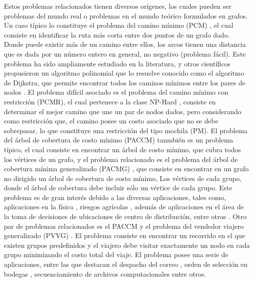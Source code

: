 Estos problemas relacionados tienen diversos orígenes, los cuales pueden ser problemas del mundo real o problemas en el mundo teórico formulados en grafos.
Un caso típico lo constituye el problema del camino mínimo (PCM) \citep{papadimitriou1982combinatorial}, el cual consiste en identificar la ruta más corta entre dos puntos de un grafo dado. Donde puede existir más de un camino entre ellos, los arcos tienen una distancia que es dada por un número entero en general, no negativo (problema fácil). Este problema ha sido ampliamente estudiado en la literatura, \cite{dijkstra1959note} y otros científicos propusieron un algoritmo polinomial que lo resuelve conocido como el algoritmo de Dijkstra, que permite encontrar todos los caminos mínimos entre los pares de nodos \citep{cook1995combinatorial}. El problema difícil asociado es el problema del camino mínimo con restricción (PCMR), el cual pertenece a la clase NP-Hard \citep{handler1980dual}, consiste en determinar el mejor camino que une un par de nodos dados, pero considerando como restricción que, el camino posee un costo asociado que no se debe sobrepasar, lo que constituye una restricción del tipo mochila (PM). El problema del árbol de cobertura de costo mínimo (PACCM)\citep{papadimitriou1982combinatorial} tanmbién es un problema típico, el cual consiste en encontrar un árbol de costo mínimo, que cubra todos los vértices de un grafo, y el problema relacionado es el problema del árbol de cobertura mínima generalizado (PACMG) \citep{dror2000generalized}, que consiste en encontrar en un grafo no dirigido un árbol de cobertura de costo mínimo, Los vértices de cada grupo, donde el árbol de cobertura debe incluir sólo un vértice de cada grupo. Este problema es de gran interés debido  a las diversas aplicaciones, tales como, aplicaciones en la física \citep{kansal2001globally}, riesgos agrícolas \citep{dror2000generalized}, además de aplicaciones en el área de la toma de decisiones de ubicaciones de centro de distribución, entre otros \citep{myung1995generalized}. Otro par de problemas relacionados es el PACCM y el problema del vendedor viajero generalizado (PVVG) \citep{srivastava1969generalized}. El problema consiste en encontrar un recorrido en el que existen grupos predefinidos y el viajero debe visitar exactamente un nodo en cada grupo minimizando el costo total del viaje. El problema posee una serie de aplicaciones, entre las que destacan el despacho del correo \citep{laporte1996some}, orden de selección en bodegas \citep{noon1991lagrangian}, secuenciamiento de archivos computacionales \citep{henrylab1969record} entre otros.

